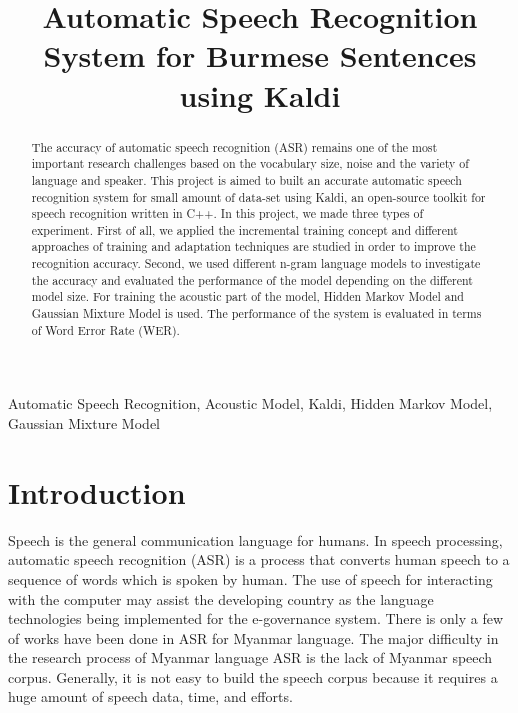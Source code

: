 \documentclass[conference]{IEEEtran}
\begin{document}
\title{Automatic Speech Recognition System for Burmese Sentences using Kaldi\\
}




\author{
\and
{}
\and
{}
}


\maketitle

\begin{abstract}
The accuracy of automatic speech recognition (ASR) remains one of the most important research challenges based on the vocabulary size, noise and the variety of language and speaker. This project is aimed to built an accurate automatic speech recognition system for small amount of data-set using Kaldi, an open-source toolkit for speech recognition written in C++. In this project, we made three types of experiment. First of all, we applied the incremental training concept and different approaches of training and adaptation techniques are studied in order to improve the recognition accuracy. Second, we used different n-gram language models to investigate the accuracy and evaluated the performance of the model depending on the different model size. For training the acoustic part of the model, Hidden Markov Model and Gaussian Mixture Model is used. The performance of the system is evaluated in terms of Word Error Rate (WER).
\end{abstract}

\begin{IEEEkeywords}
Automatic Speech Recognition, Acoustic Model, Kaldi, Hidden Markov Model, Gaussian Mixture Model
\end{IEEEkeywords}

\section{Introduction}
\label{sec:intro}

Speech is the general communication language for humans. In speech processing, automatic speech recognition (ASR) is a process that converts human speech to a sequence of words which is spoken by human. The use of speech for interacting with the computer may assist the developing country as the language technologies being implemented for the e-governance system. There is only a few of works have been done in ASR for Myanmar language. The major difficulty in the research process of Myanmar language ASR is the lack of Myanmar speech corpus. Generally, it is not easy to build the speech corpus because it requires a huge amount of speech data, time, and efforts.
\end{document}
